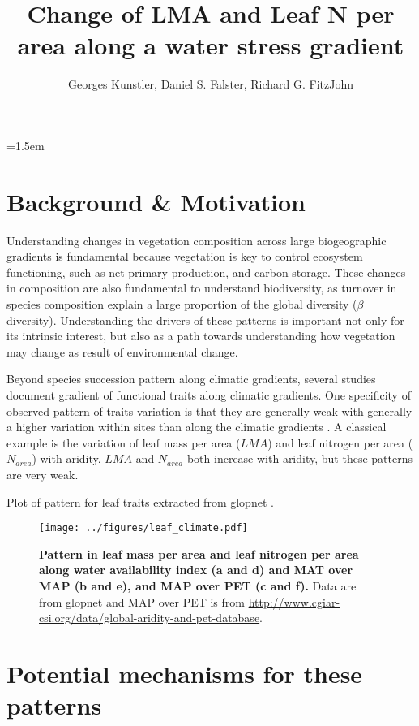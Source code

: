 \documentclass[a4paper,11pt]{article}
\title{Change of LMA and Leaf N per area along a water stress gradient}
\author{Georges Kunstler, Daniel S. Falster, Richard G. FitzJohn}
\date{}
\affiliation{Irstea, Grenoble, France and Department of Biological Sciences, Macquarie University,
  Sydney, Australia}
\date{}
\begin{document}
\mstitleshort
\parindent=1.5em
\addtolength{\parskip}{.3em}


\section{Background \& Motivation}

Understanding changes in vegetation composition across large biogeographic gradients is fundamental because vegetation is key to control ecosystem functioning, such as net primary production, and carbon storage. These changes in composition are also fundamental to understand biodiversity, as turnover in species composition explain a large proportion of the global diversity ($\beta$ diversity). Understanding the drivers of these patterns is important not only for its intrinsic interest, but also as a path towards understanding how vegetation may change as result of environmental change.

Beyond species succession pattern along climatic gradients, several
studies document gradient of functional traits along climatic
gradients. One specificity of observed pattern of traits variation is
that they are generally weak with generally a higher variation within
sites than along the climatic gradients \citep[see][]{Wright-2004}. A
classical example is the variation of leaf mass per area ($LMA$) and
leaf nitrogen per area ($N_{area}$) with aridity. $LMA$
\citep{Wright-2004,Onoda-2011,Moles-2014} and $N_{area}$
\citep{Wright-2005,Maire-2015} both increase with aridity, but these
patterns are very weak.


Plot of pattern for leaf traits extracted from glopnet \citep{Wright-2004}.

\begin{figure}[ht]
\centering
\texttt{[image: ../figures/leaf\_climate.pdf]}
\caption{\textbf{Pattern in leaf mass per area and leaf nitrogen per area along water availability index (a and d) and MAT over MAP (b and e), and MAP over PET (c and f).} Data are from glopnet \citep{Wright-2004} and MAP over PET is from \url{http://www.cgiar-csi.org/data/global-aridity-and-pet-database}.
\label{fig:leafpattern}}
\end{figure}

\clearpage

\section{Potential mechanisms for these patterns}
\end{document}
